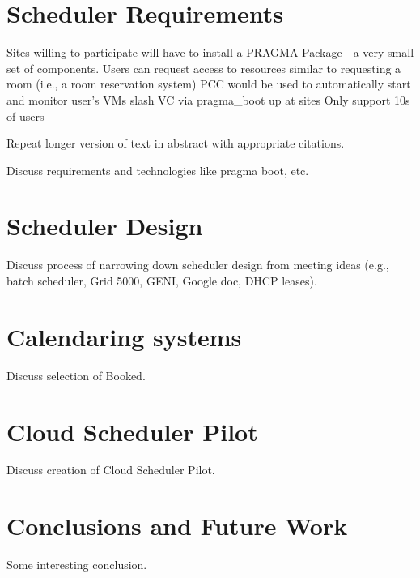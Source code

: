 \documentclass{acm_proc_article-sp}
\begin{document}
\section{Scheduler Requirements}

Sites willing to participate will have to install a PRAGMA Package - a very small set of components.
Users can request access to resources similar to requesting a room (i.e., a room reservation system)
PCC would be used to automatically start and monitor user's VMs slash VC via pragma\_boot up at sites 
Only support 10s of users


Repeat longer version of text in abstract with appropriate citations.

Discuss requirements and technologies like pragma boot, etc.


\section{Scheduler Design}
\label{Sec:Design}

Discuss process of narrowing down scheduler design from meeting ideas 
(e.g., batch scheduler, Grid 5000, GENI, Google doc, DHCP leases).

\section{Calendaring systems}
\label{Sec:Calendars}

Discuss selection of Booked.

\section{Cloud Scheduler Pilot}
\label{Sec:Pilot}

Discuss creation of Cloud Scheduler Pilot.

\section{Conclusions and Future Work}
\label{Sec:Conclusions}

Some interesting conclusion.



  
\end{document}

